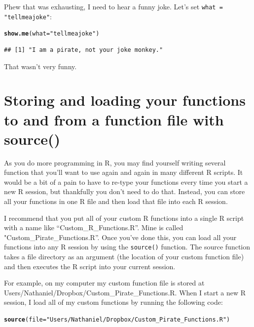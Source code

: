 \documentclass{tufte-book}\usepackage[]{graphicx}\usepackage[]{color}
\makeatletter
\newcommand{\hlstr}[1]{\textcolor[rgb]{0.192,0.494,0.8}{#1}}%
\newcommand{\hlstd}[1]{\textcolor[rgb]{0.345,0.345,0.345}{#1}}%
\newcommand{\hlkwc}[1]{\textcolor[rgb]{0.333,0.667,0.333}{#1}}%
\newcommand{\hlkwd}[1]{\textcolor[rgb]{0.737,0.353,0.396}{\textbf{#1}}}%
\newenvironment{kframe}{%
 \def\at@end@of@kframe{}%
 \ifinner\ifhmode%
  \def\at@end@of@kframe{\end{minipage}}%
  \begin{minipage}{\columnwidth}%
 \fi\fi%
 \def\FrameCommand##1{\hskip\@totalleftmargin \hskip-\fboxsep
 \colorbox{shadecolor}{##1}\hskip-\fboxsep
     \hskip-\linewidth \hskip-\@totalleftmargin \hskip\columnwidth}%
 \MakeFramed {\advance\hsize-\width
   \@totalleftmargin\z@ \linewidth\hsize
   \@setminipage}}%
 {\par\unskip\endMakeFramed%
 \at@end@of@kframe}
\newenvironment{knitrout}{}{} %
\makeatother
\begin{document}
Phew that was exhausting, I need to hear a funny joke. Let's set \texttt{what = "tellmeajoke"}:

\begin{knitrout}
\color{fgcolor}\begin{kframe}
\begin{alltt}
\hlkwd{show.me}\hlstd{(}\hlkwc{what} \hlstd{=} \hlstr{"tellmeajoke"}\hlstd{)}
\end{alltt}
\begin{verbatim}
## [1] "I am a pirate, not your joke monkey."
\end{verbatim}
\end{kframe}
\end{knitrout}

That wasn't very funny.


\section{Storing and loading your functions to and from a function file with source()}

As you do more programming in R, you may find yourself writing several function that you'll want to use again and again in many different R scripts. It would be a bit of a pain to have to re-type your functions every time you start a new R session, but thankfully you don't need to do that. Instead, you can store all your functions in one R file and then load that file into each R session.

I recommend that you put all of your custom R functions into a single R script with a name like ``Custom\_R\_Functions.R''. Mine is called "Custom\_Pirate\_Functions.R''. Once you've done this, you can load all your functions into any R session by using the \texttt{source()} function. The source function takes a file directory as an argument (the location of your custom function file) and then executes the R script into your current session.

For example, on my computer my custom function file is stored at Users/Nathaniel/Dropbox/Custom\_Pirate\_Functions.R. When I start a new R session, I load all of my custom functions by running the following code:

\begin{knitrout}
\color{fgcolor}\begin{kframe}
\begin{alltt}
\hlkwd{source}\hlstd{(}\hlkwc{file} \hlstd{=} \hlstr{"Users/Nathaniel/Dropbox/Custom_Pirate_Functions.R"}\hlstd{)}
\end{alltt}
\end{kframe}
\end{knitrout}
\end{document}
